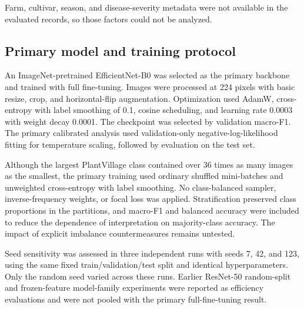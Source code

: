 \documentclass{sbc2023}%
\begin{document}
Farm, cultivar, season, and disease-severity metadata were not available in the evaluated records, so those factors could not be analyzed.

\subsection{Primary model and training protocol}
An ImageNet-pretrained EfficientNet-B0 was selected as the primary backbone and trained with full fine-tuning. Images were processed at 224 pixels with basic resize, crop, and horizontal-flip augmentation. Optimization used AdamW, cross-entropy with label smoothing of 0.1, cosine scheduling, and learning rate 0.0003 with weight decay 0.0001. The checkpoint was selected by validation macro-F1. The primary calibrated analysis used validation-only negative-log-likelihood fitting for temperature scaling, followed by evaluation on the test set.

Although the largest PlantVillage class contained over 36 times as many images as the smallest, the primary training used ordinary shuffled mini-batches and unweighted cross-entropy with label smoothing. No class-balanced sampler, inverse-frequency weights, or focal loss was applied. Stratification preserved class proportions in the partitions, and macro-F1 and balanced accuracy were included to reduce the dependence of interpretation on majority-class accuracy. The impact of explicit imbalance countermeasures remains untested.



Seed sensitivity was assessed in three independent runs with seeds 7, 42, and 123, using the same fixed train/validation/test split and identical hyperparameters. Only the random seed varied across these runs. Earlier ResNet-50 random-split and frozen-feature model-family experiments were reported as efficiency evaluations and were not pooled with the primary full-fine-tuning result.
\end{document}
